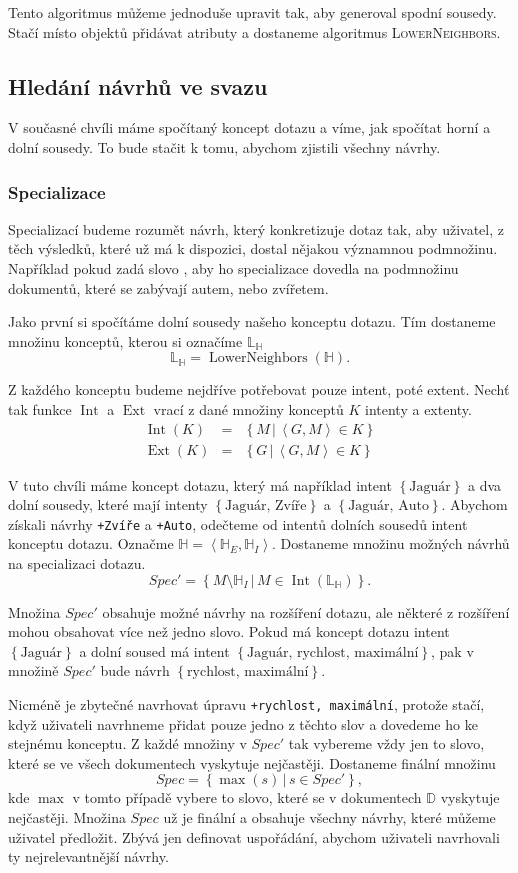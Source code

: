 \documentclass[12pt]{article}
\newcommand{\code}[1]{\texttt{#1}}
\newcommand{\sep}{\,|\,}
\newcommand{\ssection}[1]{\subsection{#1}}
\newcommand{\sssection}[1]{\subsubsection{#1}}
\newcommand{\adds}[1]{\left\{#1\right\}}
\newcommand{\addsp}[1]{\left<#1\right>}
\DeclareMathOperator{\ext}{Ext}
\DeclareMathOperator{\intfca}{Int}
\DeclareMathOperator{\lowerneighbors}{LowerNeighbors}
\newcommand{\alldoc}{\mathbb{D}}
\newcommand{\hledany}{\mathbb{H}}
\newcommand{\lowerc}{\mathbb{L}}
\begin{document}
Tento algoritmus můžeme jednoduše upravit tak, aby generoval spodní sousedy. Stačí místo objektů přidávat atributy a dostaneme algoritmus \textsc{LowerNeighbors}.

\ssection{Hledání návrhů ve svazu}

V současné chvíli máme spočítaný koncept dotazu a víme, jak spočítat horní a dolní sousedy. To bude stačit k tomu, abychom zjistili všechny návrhy. 

\sssection{Specializace}
Specializací budeme rozumět návrh, který konkretizuje dotaz tak, aby uživatel, z těch výsledků, které už má k dispozici, dostal nějakou významnou podmnožinu. Například pokud zadá slovo , aby ho specializace dovedla na podmnožinu dokumentů, které se zabývají autem, nebo zvířetem. 

Jako první si spočítáme dolní sousedy našeho konceptu dotazu. Tím dostaneme množinu konceptů, kterou si označíme $\lowerc_\hledany$
$$
\lowerc_\hledany=\lowerneighbors(\hledany).
$$

Z každého konceptu budeme nejdříve potřebovat pouze intent, poté extent. Nechť tak funkce $\intfca$ a $\ext$ vrací z dané množiny konceptů $K$ intenty a extenty.
\begin{eqnarray}
\intfca(K)&=&\adds{M\sep \addsp{G, M} \in K}\\
\ext(K)&=&\adds{G\sep \addsp{G, M} \in K}
\end{eqnarray}

V tuto chvíli máme koncept dotazu, který má například intent $\adds{\mbox{Jaguár}}$ a dva dolní sousedy, které mají intenty $\adds{\mbox{Jaguár, Zvíře}}$ a $\adds{\mbox{Jaguár, Auto}}$. Abychom získali návrhy \code{+Zvíře} a \code{+Auto}, odečteme od intentů dolních sousedů intent konceptu dotazu. Označme $\hledany=\addsp{\hledany_E, \hledany_I}$. Dostaneme množinu možných návrhů na specializaci dotazu. 
$$
Spec'=\adds{M\setminus\hledany_I\sep M \in \intfca(\lowerc_\hledany)}. 
$$

Množina $Spec'$ obsahuje možné návrhy na rozšíření dotazu, ale některé z rozšíření mohou obsahovat více než jedno slovo. Pokud má koncept dotazu intent $\adds{\mbox{Jaguár}}$ a dolní soused má intent $\adds{\mbox{Jaguár, rychlost, maximální}}$, pak v množině $Spec'$ bude návrh $\adds{\mbox{rychlost, maximální}}$. 

Nicméně je zbytečné navrhovat úpravu \code{+rychlost, maximální}, protože stačí, když uživateli navrhneme přidat pouze jedno z těchto slov a dovedeme ho ke stejnému konceptu. Z každé množiny v $Spec'$ tak vybereme vždy jen to slovo, které se ve všech dokumentech vyskytuje nejčastěji. Dostaneme finální množinu
$$
Spec=\adds{\max(s)\sep s\in Spec'},
$$
kde $\max$ v tomto případě vybere to slovo, které se v dokumentech $\alldoc$ vyskytuje nejčastěji. Množina $Spec$ už je finální a obsahuje všechny návrhy, které můžeme uživatel předložit. Zbývá jen definovat uspořádání, abychom uživateli navrhovali ty nejrelevantnější návrhy. 
\end{document}
